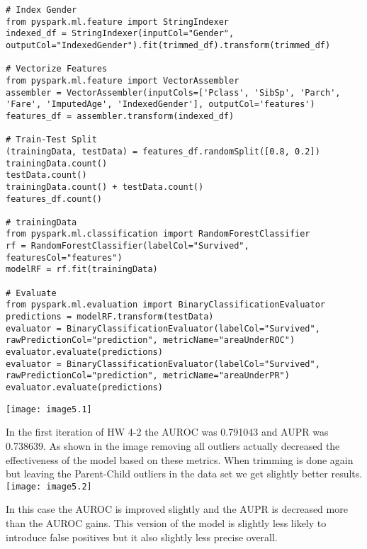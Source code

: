 \documentclass[]{article}
\begin{document}
\begin{verbatim}
# Index Gender
from pyspark.ml.feature import StringIndexer
indexed_df = StringIndexer(inputCol="Gender", outputCol="IndexedGender").fit(trimmed_df).transform(trimmed_df)

# Vectorize Features
from pyspark.ml.feature import VectorAssembler
assembler = VectorAssembler(inputCols=['Pclass', 'SibSp', 'Parch', 'Fare', 'ImputedAge', 'IndexedGender'], outputCol='features')
features_df = assembler.transform(indexed_df)

# Train-Test Split
(trainingData, testData) = features_df.randomSplit([0.8, 0.2])
trainingData.count()
testData.count()
trainingData.count() + testData.count()
features_df.count()

# trainingData
from pyspark.ml.classification import RandomForestClassifier
rf = RandomForestClassifier(labelCol="Survived", featuresCol="features")
modelRF = rf.fit(trainingData)

# Evaluate
from pyspark.ml.evaluation import BinaryClassificationEvaluator
predictions = modelRF.transform(testData)
evaluator = BinaryClassificationEvaluator(labelCol="Survived", rawPredictionCol="prediction", metricName="areaUnderROC")
evaluator.evaluate(predictions)
evaluator = BinaryClassificationEvaluator(labelCol="Survived", rawPredictionCol="prediction", metricName="areaUnderPR")
evaluator.evaluate(predictions)
\end{verbatim}
\texttt{[image: image5.1]}

In the first iteration of HW 4-2 the AUROC was 0.791043 and AUPR was 0.738639.
As shown in the image removing all outliers actually decreased the effectiveness of the model based on these metrics.
When trimming is done again but leaving the Parent-Child outliers in the data set we get slightly better results. \\
\texttt{[image: image5.2]}

In this case the AUROC is improved slightly and the AUPR is decreased more than the AUROC gains. This version of the model is slightly less likely to introduce false positives but it also slightly less precise overall.
\end{document}
